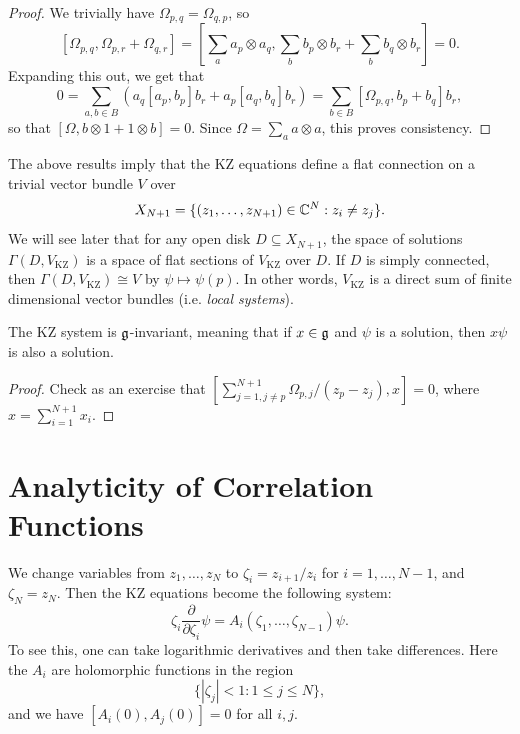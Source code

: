 \begin{proof}
  We trivially
  have $\Omega_{p, q} = \Omega_{q, p}$, so
  \[
    [\Omega_{p, q}, \Omega_{p, r} + \Omega_{q, r}]
    = \left[
      \sum_a a_{p} \otimes a_q, \sum_b b_p \otimes b_r + \sum_b b_q \otimes b_r
    \right]
    = 0.
  \]
  Expanding this out, we get that
  \[
    0
    = \sum_{a, b \in B}
    (a_q [a_p, b_p] b_r + a_p [a_q, b_q] b_r)
    = \sum_{b \in B} [\Omega_{p, q}, b_p + b_q] b_r,
  \]
  so that $[\Omega, b\otimes 1 + 1 \otimes b] = 0$. Since
  $\Omega = \sum_a a \otimes a$, this
  proves consistency.
\end{proof}

\begin{remark}
  The above results imply that the
  KZ equations define a flat connection
  on a trivial vector bundle $V$ over
  \[
    X_{N + 1}
    = \{
      (z_1, \dots, z_{N + 1}) \in \mathbb{C}^N
      : z_i \ne z_j
    \}.
  \]
  We will see later that
  for any open disk $D \subseteq X_{N + 1}$,
  the space of solutions
  $\Gamma(D, V_{\mathrm{KZ}})$ is a space
  of flat sections of $V_{\mathrm{KZ}}$
  over $D$. If $D$ is simply connected,
  then $\Gamma(D, V_{\mathrm{KZ}}) \cong V$
  by $\psi \mapsto \psi(p)$.
  In other words,
  $V_{\mathrm{KZ}}$ is a direct sum of
  finite dimensional vector bundles
  (i.e. \emph{local systems}).
\end{remark}

\begin{theorem}
  The KZ system is $\mathfrak{g}$-invariant, meaning
  that if $x \in \mathfrak{g}$ and $\psi$ is a solution,
  then $x \psi$ is also a solution.
\end{theorem}

\begin{proof}
  Check as an exercise that
  $[\sum_{j = 1, j \ne p}^{N + 1}
      \Omega_{p, j} / (z_p - z_j), x
      ] = 0$,
  where $x = \sum_{i = 1}^{N + 1} x_i$.
\end{proof}

\section{Analyticity of Correlation Functions}

\begin{remark}
  We change variables from $z_1, \dots, z_N$
  to $\zeta_i = z_{i + 1} / z_i$
  for $i = 1, \dots, N - 1$, and $\zeta_N = z_N$.
  Then the KZ equations become the following
  system:
  \[
    \zeta_i \frac{\partial}{\partial \zeta_i} \psi = A_i(\zeta_1, \dots, \zeta_{N - 1}) \psi.
  \]
  To see this, one can take
  logarithmic derivatives and then take
  differences. Here the $A_i$ are
  holomorphic functions in the region
  \[\{|\zeta_j| < 1 : 1 \le j \le N\},\]
  and we have $[A_i(0), A_j(0)] = 0$
  for all $i, j$.
\end{remark}

